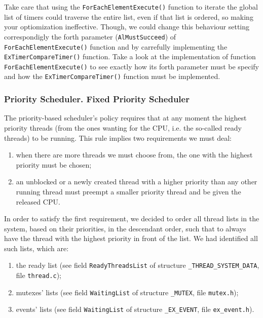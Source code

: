 Take care that using the \lstinline|ForEachElementExecute()| function to iterate the global list of timers could traverse the entire list, even if that list is ordered, so making your optiomization ineffective. Though, we could change this behaviour setting correspondigly the forth parameter (\lstinline|AlMustSucceed|) of \lstinline|ForEachElementExecute()| function and by carrefully implementing the \lstinline|ExTimerCompareTimer()| function. Take a look at the implementation of function \lstinline|ForEachElementExecute()| to see exactly how its forth parameter must be specify and how the \lstinline|ExTimerCompareTimer()| function must be implemented. 

\subsubsection{Priority Scheduler. Fixed Priority Scheduler}

The priority-based scheduler's policy requires that at any moment the highest priority threads (from the ones wanting for the CPU, i.e. the so-called ready threads) to be running. This rule implies two requirements we must deal: 
\begin{enumerate}
    \item when there are more threads we must choose from, the one with the highest priority must be chosen;
    
    \item an unblocked or a newly created thread with a higher priority than any other running thread must preempt a smaller priority thread and be given the released CPU.
\end{enumerate}

In order to satisfy the first requirement, we decided to order all thread lists in the system, based on their priorities, in the descendant order, such that to always have the thread with the highest priority in front of the list. We had identified all such lists, which are:
\begin{enumerate}
    \item the ready list (see field \lstinline|ReadyThreadsList| of structure \lstinline|_THREAD_SYSTEM_DATA|, file \lstinline|thread.c|);
    
    \item mutexes' lists (see field \lstinline|WaitingList| of structure \lstinline|_MUTEX|, file \lstinline|mutex.h|);
    
    \item events' lists (see field \lstinline|WaitingList| of structure \lstinline|_EX_EVENT|, file \lstinline|ex_event.h|).
\end{enumerate}

